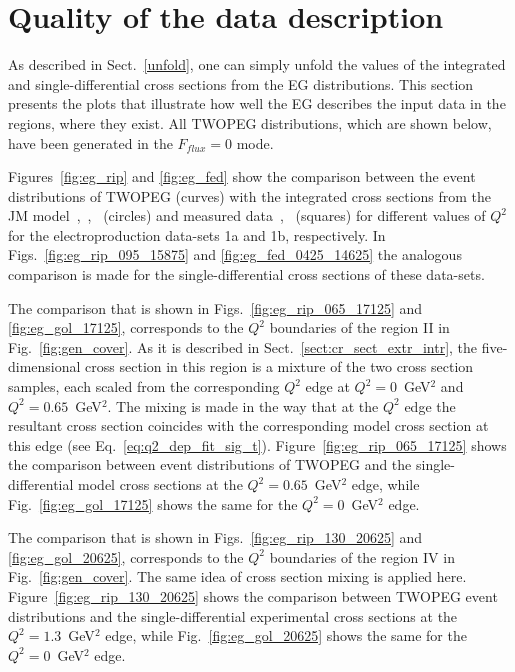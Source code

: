 \chapter{Quality of the data description}
\label{quality}
As described in Sect.~\ref{unfold}, one can simply unfold the values of the integrated and single-differential cross sections from the EG distributions.  This section presents the plots that illustrate how well the EG describes the input data in the regions, where they exist. All TWOPEG distributions, which are shown below, have been generated in the $F_{flux}=0$ mode.  

Figures~\ref{fig:eg_rip} and \ref{fig:eg_fed} show the comparison between the event distributions of TWOPEG (curves) with the integrated cross sections from the JM model~\cite{Mokeev:2015lda},~\cite{Mokeev:2008iw},~\cite{Mokeev:2012vsa}  (circles) and measured data~\cite{Ripani:2002ss},~\cite{Fedotov:2008aa} (squares) for different values of $Q^2$ for the electroproduction data-sets 1a and 1b, respectively. In Figs.~\ref{fig:eg_rip_095_15875} and \ref{fig:eg_fed_0425_14625} the analogous comparison is made for the single-differential cross sections of these data-sets.

The comparison that is shown in Figs.~\ref{fig:eg_rip_065_17125} and \ref{fig:eg_gol_17125}, corresponds to the $Q^2$ boundaries of the region II in Fig.~\ref{fig:gen_cover}. As it is described in Sect.~\ref{sect:cr_sect_extr_intr}, the five-dimensional cross section in this region is a mixture of the two cross section samples, each scaled from the corresponding $Q^2$ edge at $Q^2 = 0$~GeV$^2$ and $Q^2 = 0.65$~GeV$^2$. The mixing is made in the way that at the $Q^2$ edge the resultant cross section coincides with the corresponding model cross section at this edge (see Eq.~\eqref{eq:q2_dep_fit_sig_t}). Figure~\ref{fig:eg_rip_065_17125} shows the comparison between event distributions of TWOPEG and the single-differential model cross sections at the $Q^2 = 0.65$~GeV$^2$ edge, while Fig.~\ref{fig:eg_gol_17125} shows the same for the $Q^2 = 0$~GeV$^2$ edge. 

The comparison that is shown in Figs.~\ref{fig:eg_rip_130_20625} and \ref{fig:eg_gol_20625}, corresponds to the $Q^2$ boundaries of the region IV in Fig.~\ref{fig:gen_cover}. The same idea of cross section mixing is applied here. Figure~\ref{fig:eg_rip_130_20625} shows the comparison between TWOPEG event distributions and the single-differential experimental cross sections at the $Q^2 = 1.3$~GeV$^2$ edge, while Fig.~\ref{fig:eg_gol_20625} shows the same for the $Q^2 = 0$~GeV$^2$ edge. 

